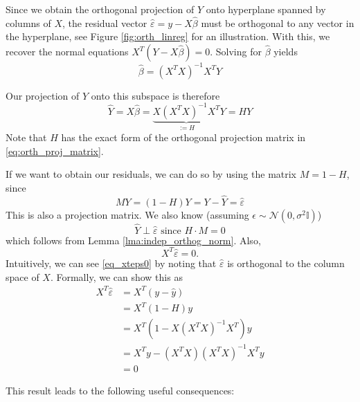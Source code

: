 \documentclass[11pt, %
	oneside, %
	english, %
	onehalfspacing, %
	]{article} %
\numberwithin{equation}{section}
\begin{document}
Since we obtain the orthogonal projection of $Y$ onto hyperplane spanned by columns of $X$, the residual vector $\hat{\varepsilon} = y - X \hat{\beta}$ must be orthogonal to any vector in the hyperplane, see Figure \ref{fig:orth_linreg} for an illustration. With this, we recover the normal equations $X^T(Y- X \hat{\beta}) = 0$. Solving for $\hat{\beta}$ yields
\begin{equation*}
    \hat{\beta}=\left(X^T X\right)^{-1} X^T Y
\end{equation*}

Our projection of $Y$ onto this subspace is therefore
\begin{equation*}
    \hat{Y}=X \hat{\beta}=\underbrace{X\left(X^T X\right)^{-1} X^T}_{:= H} Y= H Y
\end{equation*}
Note that $H$ has the exact form of the orthogonal projection matrix in \eqref{eq:orth_proj_matrix}.

If we want to obtain our residuals, we can do so by using the matrix $M = 1-H$, since
\begin{equation*}
    MY = (1-H) Y = Y-\hat{Y} = \hat{\varepsilon}
\end{equation*}
This is also a projection matrix. We also know (assuming $\epsilon \sim \mathcal{N}(0, \sigma^2 \mathbb{I})$)
\begin{equation}
    \hat{Y} \perp \hat{\varepsilon} \text{ since } H \cdot M = 0
\end{equation}
which follows from Lemma \ref{lma:indep_orthog_norm}. Also,
\begin{equation}\label{eq_xteps0}
    X^T \hat{\varepsilon} = 0.
\end{equation}
Intuitively, we can see \eqref{eq_xteps0} by noting that $\hat{\varepsilon}$ is orthogonal to the column space of $X$. Formally, we can show this as
$$
\begin{aligned}
    X^T \hat{\varepsilon} &= X^T(y- \hat{y}) \\
    &= X^T(1-H)y \\
    &= X^T (1 - X (X^TX)^{-1} X^T)y \\
    &= X^T y - (X^TX) (X^TX) ^{-1} X^T y \\
    &= 0
\end{aligned}
$$

This result leads to the following useful consequences:
\end{document}
